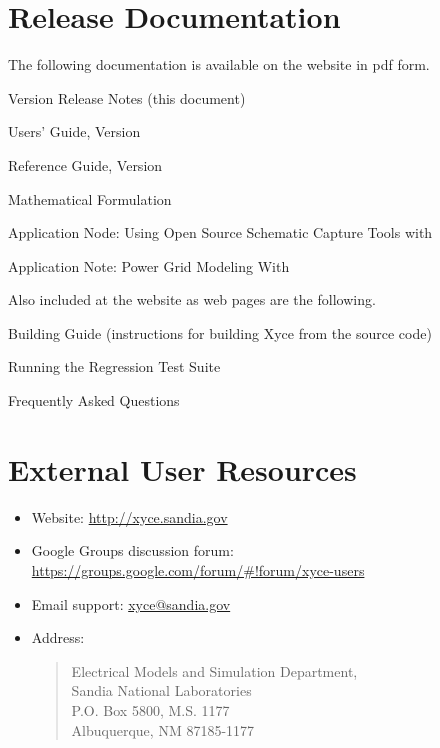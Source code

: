 \documentclass{article}
\begin{document}
\section{\Xyce{} Release \XyceVersionVar{} Documentation}
The following \Xyce{} documentation is available on the \Xyce{} website in pdf
form.
\begin{XyceItemize}
  \item \Xyce{} Version \XyceVersionVar{} Release Notes (this document)
  \item \Xyce{} Users' Guide, Version \XyceVersionVar{}
  \item \Xyce{} Reference Guide, Version \XyceVersionVar{}
  \item \Xyce{} Mathematical Formulation
  \item Application Node: Using Open Source Schematic Capture Tools with \Xyce{}
  \item Application Note: Power Grid Modeling With \Xyce{}
\end{XyceItemize}
Also included at the \Xyce{} website as web pages are the following.
\begin{XyceItemize}
  \item Building Guide (instructions for building Xyce{} from the source code)
  \item Running the \Xyce{} Regression Test Suite
  \item Frequently Asked Questions
\end{XyceItemize}


\section{External User Resources}
\begin{itemize}
  \item Website: {\color{XyceDeepRed}\url{http://xyce.sandia.gov}}
  \item Google Groups discussion forum:
    {\color{XyceDeepRed}\url{https://groups.google.com/forum/#!forum/xyce-users}}
  \item Email support:
    {\color{XyceDeepRed}\href{mailto:xyce@sandia.gov}{xyce@sandia.gov}}
  \item Address:
    \begin{quote}
            Electrical Models and Simulation Department,\\
            Sandia National Laboratories\\
            P.O. Box 5800, M.S. 1177\\
            Albuquerque, NM 87185-1177 \\
    \end{quote}
\end{itemize}
\end{document}
